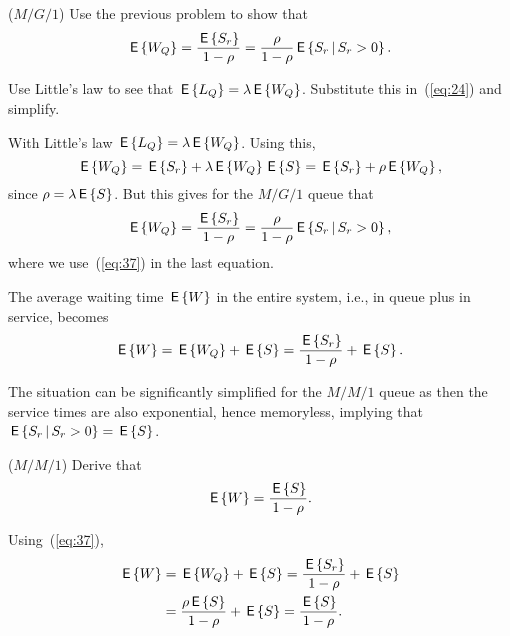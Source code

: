 \begin{exercise}($M/G/1$)
  Use the previous problem to show that 
\begin{equation}\label{eq:35}
  \E{W_Q} = \frac{\E{S_r}}{1-\rho} = \frac{\rho}{1-\rho} \E{S_r\given S_r>0}.
\end{equation}
\begin{hint}
Use Little's law to see that $\E{L_Q} = \lambda \E{W_Q}$. Substitute this in~(\ref{eq:24}) and simplify.
\end{hint}
\begin{solution}
With  Little's law $\E{L_Q} = \lambda \E{W_Q}$. Using this,
\begin{equation*}
  \E{W_Q} = \E{S_r} + \lambda \E{W_Q} \E S  =\E{S_r} + \rho \E{W_Q},
\end{equation*}
since $\rho=\lambda \E S$. But this gives for the $M/G/1$ queue that
\begin{equation*}
  \E{W_Q} = \frac{\E{S_r}}{1-\rho} = \frac{\rho}{1-\rho} \E{S_r\given S_r>0},
\end{equation*}
where we use~(\ref{eq:37}) in the last equation.
\end{solution}
\end{exercise}

The average waiting time $\E W$ in the entire system, i.e., in queue
plus in service, becomes
\begin{equation*}
  \E W = \E{W_Q}+ \E S = \frac{\E{S_r}}{1-\rho} + \E S.
\end{equation*}

The situation can be significantly simplified for the $M/M/1$ queue as
then the service times are also exponential, hence memoryless,
implying that $\E{S_r\given S_r>0} = \E S$. 

\begin{exercise}($M/M/1$) Derive that
\begin{equation}\label{eq:ew}
  \E W = \frac{\E S}{1-\rho}.
\end{equation}
\begin{solution}
Using~(\ref{eq:37}),
\begin{equation*}
  \begin{split}
  \E W 
&= \E{W_Q}+ \E S = 
\frac{\E{S_r}}{1-\rho} + \E S \\
&= \frac{\rho \E S}{1-\rho} + \E S = \frac{\E S}{1-\rho}.
  \end{split}
\end{equation*}
\end{solution}
\end{exercise}

